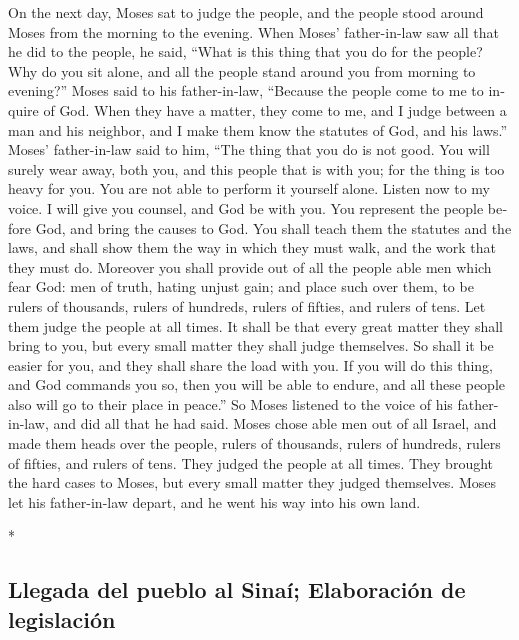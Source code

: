 \begin{paracol}{2}
\begin{otherlanguage}{english}
 On the next day, Moses sat to judge the people, and the
people stood around Moses from the morning to the evening.
 When Moses' father-in-law saw all that he did to the
people, he said, ``What is this thing that you do for the people? Why do
you sit alone, and all the people stand around you from morning to
evening?''  Moses said to his father-in-law, ``Because
the people come to me to inquire of God.  When they have
a matter, they come to me, and I judge between a man and his neighbor,
and I make them know the statutes of God, and his laws.''
 Moses' father-in-law said to him, ``The thing that you
do is not good.  You will surely wear away, both you, and
this people that is with you; for the thing is too heavy for you. You
are not able to perform it yourself alone.  Listen now to
my voice. I will give you counsel, and God be with you. You represent
the people before God, and bring the causes to God.  You
shall teach them the statutes and the laws, and shall show them the way
in which they must walk, and the work that they must do. 
Moreover you shall provide out of all the people able men which fear
God: men of truth, hating unjust gain; and place such over them, to be
rulers of thousands, rulers of hundreds, rulers of fifties, and rulers
of tens.  Let them judge the people at all times. It
shall be that every great matter they shall bring to you, but every
small matter they shall judge themselves. So shall it be easier for you,
and they shall share the load with you.  If you will do
this thing, and God commands you so, then you will be able to endure,
and all these people also will go to their place in peace.''
 So Moses listened to the voice of his father-in-law, and
did all that he had said.  Moses chose able men out of
all Israel, and made them heads over the people, rulers of thousands,
rulers of hundreds, rulers of fifties, and rulers of tens.
 They judged the people at all times. They brought the
hard cases to Moses, but every small matter they judged themselves.
 Moses let his father-in-law depart, and he went his way
into his own land.

\end{otherlanguage}

\switchcolumn[0]*

\hypertarget{llegada-del-pueblo-al-sinauxed-elaboraciuxf3n-de-legislaciuxf3n}{%
\subsection{Llegada del pueblo al Sinaí; Elaboración de
legislación}\label{llegada-del-pueblo-al-sinauxed-elaboraciuxf3n-de-legislaciuxf3n}}


\end{paracol}
